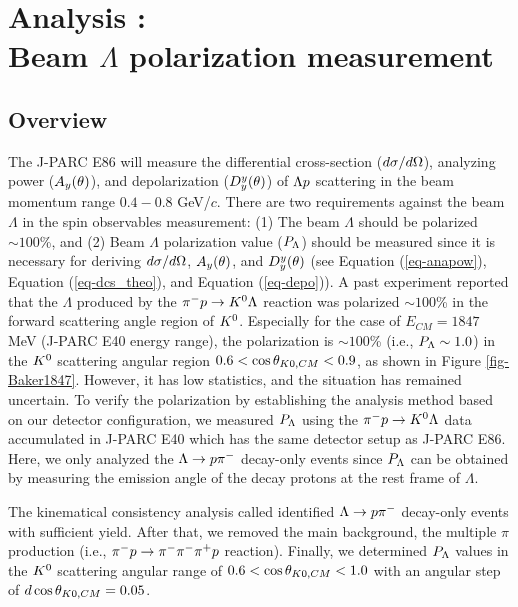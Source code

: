 %
\graphicspath{{./pictures/chapter_Pl/}}

\chapter{Analysis : \\Beam $\Lambda$ polarization measurement} 
\label{chap-Pl}

\section{Overview}

The J-PARC E86 will measure the differential cross-section ($d\sigma/d\Omega$), analyzing power ($A_{y}(\theta)$), and depolarization ($D^{y}_{y}(\theta)$) of $\Lambda p$ scattering in the beam momentum range $0.4-0.8$ GeV/$c$. There are two requirements against the beam $\Lambda$ in the spin observables measurement: (1) The beam $\Lambda$ should be polarized $\sim100$\%, and (2) Beam $\Lambda$ polarization value ($P_{\Lambda}$) should be measured since it is necessary for deriving $d\sigma/d\Omega$, $A_{y}(\theta)$, and $D^{y}_{y}(\theta)$ (see Equation (\ref{eq-anapow}), Equation (\ref{eq-dcs_theo}), and Equation (\ref{eq-depo})). A past experiment \cite{Baker} reported that the $\Lambda$ produced by the $\pi^- p \to K^0 \Lambda$ reaction was polarized $\sim100$\% in the forward scattering angle region of $K^{0}$. Especially for the case of $E_{CM}=1847$ MeV (J-PARC E40 energy range), the polarization is $\sim100$\% (i.e., $P_{\Lambda}\sim1.0$) in the $K^{0}$ scattering angular region $0.6<\cos{\theta_{K0,CM}}<0.9$, as shown in Figure \ref{fig-Baker1847}. However, it has low statistics, and the situation has remained uncertain. To verify the polarization by establishing the analysis method based on our detector configuration, we measured $P_{\Lambda}$ using the $\pi^- p \to K^0 \Lambda$ data accumulated in J-PARC E40 which has the same detector setup as J-PARC E86. Here, we only analyzed the $\Lambda\to p\pi^{-}$ decay-only events since $P_{\Lambda}$ can be obtained by measuring the emission angle of the decay protons at the rest frame of $\Lambda$.

The kinematical consistency analysis called  identified $\Lambda\to p\pi^{-}$ decay-only events with sufficient yield. After that, we removed the main background, the multiple $\pi$ production (i.e., $\pi^- p \to \pi^-\pi^-\pi^+p$ reaction). Finally, we determined $P_{\Lambda}$ values in the $K^{0}$ scattering angular range of $0.6<\cos{\theta_{K0,CM}}<1.0$ with an angular step of $d\cos{\theta_{K0,CM}}=0.05$. %

